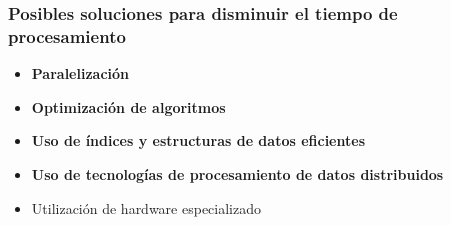 \documentclass[
10pt, %
aspectratio=169, %
]{beamer}
\begin{document}
	\begin{frame}
		
		\frametitle{Posibles soluciones para disminuir el tiempo de procesamiento}
		
		\begin{itemize}
			
			\item \textbf<3>{Paralelización} \\[2mm]
			
			\item \textbf<3>{Optimización de algoritmos} \\[2mm]
			
			\item \textbf<3>{Uso de índices y estructuras de datos eficientes} \\[2mm]
			
			\item \textbf<3>{Uso de tecnologías de procesamiento de datos distribuidos} \\[2mm]
			
			\item Utilización de hardware especializado \\[2mm]
			

\end{itemize}
\end{frame}
\end{document}

